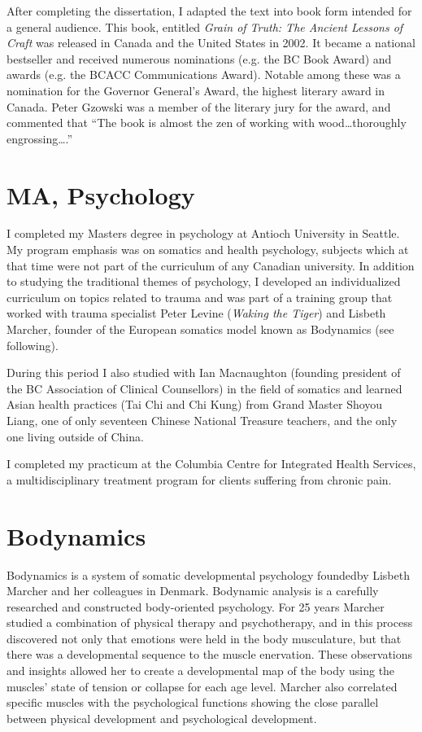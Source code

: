 \documentclass[10pt,DIV09,letterpaper,oneside,headsepline]{scrreprt}
\begin{document}
After completing the dissertation, I adapted the text into book form intended for a general audience. This book, entitled \textit{Grain of Truth: The Ancient Lessons of Craft} was released in Canada and the United States in 2002. It became a national bestseller and received numerous nominations (e.g. the BC Book Award) and awards (e.g. the BCACC Communications Award). Notable among these was a nomination for the Governor General's Award, the highest literary award in Canada. Peter Gzowski was a member of the literary jury for the award, and commented that ``The book is almost the zen of working with wood\ldots thoroughly engrossing\ldots.''
\newpage
\section{MA, Psychology}

I completed my Masters degree in psychology at Antioch University in Seattle. My program emphasis was on somatics and health psychology, subjects which at that time were not part of the curriculum of any Canadian university. In addition to studying the traditional themes of psychology, I developed an individualized curriculum on topics related to trauma and was part of a training group that worked with trauma specialist Peter Levine (\textit{Waking the Tiger}) and Lisbeth Marcher, founder of the European somatics model known as Bodynamics (see following).

During this period I also studied with Ian Macnaughton (founding president of the BC Association of Clinical Counsellors) in the field of somatics and learned Asian health practices (Tai Chi and Chi Kung) from Grand Master Shoyou Liang, one of only seventeen Chinese National Treasure teachers, and the only one living outside of China.

I completed my practicum at the Columbia Centre for Integrated Health Services, a multidisciplinary treatment program for clients suffering from chronic pain.

\section{Bodynamics}

Bodynamics is a system of somatic developmental psychology foundedby Lisbeth Marcher and her colleagues in Denmark. Bodynamic analysis is a carefully researched and constructed body-oriented psychology. For 25 years Marcher studied a combination of physical therapy and psychotherapy, and in this process discovered not only that emotions were held in the body musculature, but that there was a developmental sequence to the muscle enervation. These observations and insights allowed her to create a developmental map of the body using the muscles' state of tension or collapse for each age level. Marcher also correlated specific muscles with the psychological functions showing the close parallel between physical development and psychological development.
\end{document}
